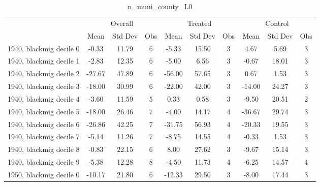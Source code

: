 \begin{table}[htbp]\centering
\def\sym#1{\ifmmode^{#1}\else\(^{#1}\)\fi}
\caption{n\_muni\_county\_L0 \label{tab1}}
\begin{tabular}{l*{3}{ccc}}
\toprule
                    &\multicolumn{3}{c}{Overall}           &\multicolumn{3}{c}{Treated}           &\multicolumn{3}{c}{Control}           \\
                    &        Mean&     Std Dev&         Obs&        Mean&     Std Dev&         Obs&        Mean&     Std Dev&         Obs\\
\midrule
1940, blackmig decile 0&       -0.33&       11.79&           6&       -5.33&       15.50&           3&        4.67&        5.69&           3\\
1940, blackmig decile 1&       -2.83&       12.35&           6&       -5.00&        6.56&           3&       -0.67&       18.01&           3\\
1940, blackmig decile 2&      -27.67&       47.89&           6&      -56.00&       57.65&           3&        0.67&        1.53&           3\\
1940, blackmig decile 3&      -18.00&       30.99&           6&      -22.00&       42.00&           3&      -14.00&       24.27&           3\\
1940, blackmig decile 4&       -3.60&       11.59&           5&        0.33&        0.58&           3&       -9.50&       20.51&           2\\
1940, blackmig decile 5&      -18.00&       26.46&           7&       -4.00&       14.17&           4&      -36.67&       29.74&           3\\
1940, blackmig decile 6&      -26.86&       42.25&           7&      -31.75&       56.93&           4&      -20.33&       19.55&           3\\
1940, blackmig decile 7&       -5.14&       11.26&           7&       -8.75&       14.55&           4&       -0.33&        1.53&           3\\
1940, blackmig decile 8&       -0.83&       22.15&           6&        8.00&       27.62&           3&       -9.67&       15.14&           3\\
1940, blackmig decile 9&       -5.38&       12.28&           8&       -4.50&       11.73&           4&       -6.25&       14.57&           4\\
1950, blackmig decile 0&      -10.17&       21.80&           6&      -12.33&       29.50&           3&       -8.00&       17.44&           3\\

\end{tabular}
\end{table}
